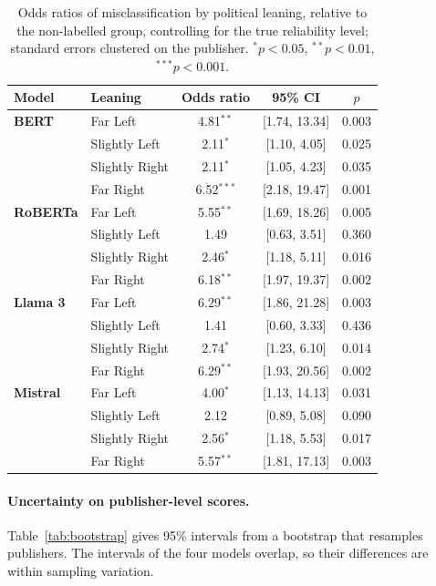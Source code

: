 \documentclass[11pt,a4paper]{article}
\begin{document}
\begin{table}[ht]
\centering
\small
\begin{tabular}{llccc}
\toprule
\textbf{Model} & \textbf{Leaning} & \textbf{Odds ratio} & \textbf{95\% CI} & \textbf{$p$} \\
\midrule
\textbf{BERT} & Far Left & 4.81$^{**}$ & [1.74, 13.34] & 0.003 \\
 & Slightly Left & 2.11$^{*}$ & [1.10, 4.05] & 0.025 \\
 & Slightly Right & 2.11$^{*}$ & [1.05, 4.23] & 0.035 \\
 & Far Right & 6.52$^{***}$ & [2.18, 19.47] & 0.001 \\
\addlinespace
\textbf{RoBERTa} & Far Left & 5.55$^{**}$ & [1.69, 18.26] & 0.005 \\
 & Slightly Left & 1.49 & [0.63, 3.51] & 0.360 \\
 & Slightly Right & 2.46$^{*}$ & [1.18, 5.11] & 0.016 \\
 & Far Right & 6.18$^{**}$ & [1.97, 19.37] & 0.002 \\
\addlinespace
\textbf{Llama 3} & Far Left & 6.29$^{**}$ & [1.86, 21.28] & 0.003 \\
 & Slightly Left & 1.41 & [0.60, 3.33] & 0.436 \\
 & Slightly Right & 2.74$^{*}$ & [1.23, 6.10] & 0.014 \\
 & Far Right & 6.29$^{**}$ & [1.93, 20.56] & 0.002 \\
\addlinespace
\textbf{Mistral} & Far Left & 4.00$^{*}$ & [1.13, 14.13] & 0.031 \\
 & Slightly Left & 2.12 & [0.89, 5.08] & 0.090 \\
 & Slightly Right & 2.56$^{*}$ & [1.18, 5.53] & 0.017 \\
 & Far Right & 5.57$^{**}$ & [1.81, 17.13] & 0.003 \\
\bottomrule
\end{tabular}
\caption{Odds ratios of misclassification by political leaning, relative to the
non-labelled group, controlling for the true reliability level; standard errors
clustered on the publisher. $^{*}p<0.05$, $^{**}p<0.01$, $^{***}p<0.001$.}
\label{tab:logit}
\end{table}

\paragraph{Uncertainty on publisher-level scores.}
Table~\ref{tab:bootstrap} gives 95\% intervals from a bootstrap that resamples publishers. The intervals of the four models overlap, so their differences are within sampling variation.
\end{document}

